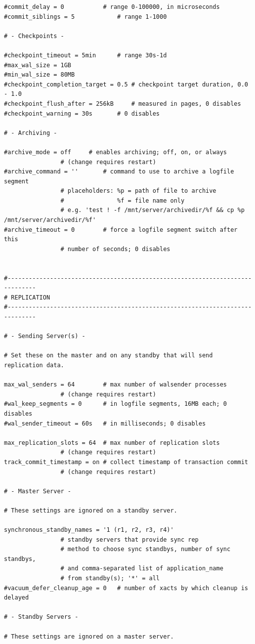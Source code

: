 \begin{verbatim}
#commit_delay = 0			# range 0-100000, in microseconds
#commit_siblings = 5			# range 1-1000

# - Checkpoints -

#checkpoint_timeout = 5min		# range 30s-1d
#max_wal_size = 1GB
#min_wal_size = 80MB
#checkpoint_completion_target = 0.5	# checkpoint target duration, 0.0 - 1.0
#checkpoint_flush_after = 256kB		# measured in pages, 0 disables
#checkpoint_warning = 30s		# 0 disables

# - Archiving -

#archive_mode = off		# enables archiving; off, on, or always
				# (change requires restart)
#archive_command = ''		# command to use to archive a logfile segment
				# placeholders: %p = path of file to archive
				#               %f = file name only
				# e.g. 'test ! -f /mnt/server/archivedir/%f && cp %p /mnt/server/archivedir/%f'
#archive_timeout = 0		# force a logfile segment switch after this
				# number of seconds; 0 disables


#------------------------------------------------------------------------------
# REPLICATION
#------------------------------------------------------------------------------

# - Sending Server(s) -

# Set these on the master and on any standby that will send replication data.

max_wal_senders = 64		# max number of walsender processes
				# (change requires restart)
#wal_keep_segments = 0		# in logfile segments, 16MB each; 0 disables
#wal_sender_timeout = 60s	# in milliseconds; 0 disables

max_replication_slots = 64	# max number of replication slots
				# (change requires restart)
track_commit_timestamp = on	# collect timestamp of transaction commit
				# (change requires restart)

# - Master Server -

# These settings are ignored on a standby server.

synchronous_standby_names = '1 (r1, r2, r3, r4)'
				# standby servers that provide sync rep
				# method to choose sync standbys, number of sync standbys,
				# and comma-separated list of application_name
				# from standby(s); '*' = all
#vacuum_defer_cleanup_age = 0	# number of xacts by which cleanup is delayed

# - Standby Servers -

# These settings are ignored on a master server.


\end{verbatim}
